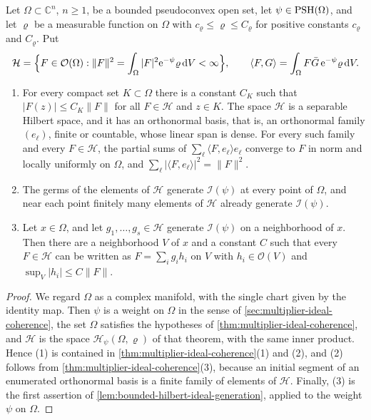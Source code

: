 \begin{lemma}\label{lem:pseudoconvex-weighted-bergman-space}
Let $\Omega\subset\mathbb C^n$, $n\geq1$, be a bounded pseudoconvex open set, let $\psi\in\mathrm{PSH}(\Omega)$, and let $\varrho$ be a measurable function on $\Omega$ with $c_\varrho\leq\varrho\leq C_\varrho$ for positive constants $c_\varrho$ and $C_\varrho$. Put
\[
 \mathcal H=\Bigl\{F\in\mathcal O(\Omega):\|F\|^2=\int_\Omega|F|^2\mathrm e^{-\psi}\varrho\,\mathrm dV<\infty\Bigr\},\qquad\langle F,G\rangle=\int_\Omega F\bar G\,\mathrm e^{-\psi}\varrho\,\mathrm dV.
\]
\begin{enumerate}
\item For every compact set $K\subset\Omega$ there is a constant $C_K$ such that $|F(z)|\leq C_K\|F\|$ for all $F\in\mathcal H$ and $z\in K$. The space $\mathcal H$ is a separable Hilbert space, and it has an orthonormal basis, that is, an orthonormal family $(e_\ell)$, finite or countable, whose linear span is dense. For every such family and every $F\in\mathcal H$, the partial sums of $\sum_\ell\langle F,e_\ell\rangle e_\ell$ converge to $F$ in norm and locally uniformly on $\Omega$, and $\sum_\ell|\langle F,e_\ell\rangle|^2=\|F\|^2$.
\item The germs of the elements of $\mathcal H$ generate $\mathcal I(\psi)$ at every point of $\Omega$, and near each point finitely many elements of $\mathcal H$ already generate $\mathcal I(\psi)$.
\item Let $x\in\Omega$, and let $g_1,\ldots,g_s\in\mathcal H$ generate $\mathcal I(\psi)$ on a neighborhood of $x$. Then there are a neighborhood $V$ of $x$ and a constant $C$ such that every $F\in\mathcal H$ can be written as $F=\sum_ig_ih_i$ on $V$ with $h_i\in\mathcal O(V)$ and $\sup_V|h_i|\leq C\|F\|$.
\end{enumerate}
\end{lemma}
\begin{proof}
We regard $\Omega$ as a complex manifold, with the single chart given by the identity map. Then $\psi$ is a weight on $\Omega$ in the sense of \cref{sec:multiplier-ideal-coherence}, the set $\Omega$ satisfies the hypotheses of \cref{thm:multiplier-ideal-coherence}, and $\mathcal H$ is the space $\mathcal H_\psi(\Omega,\varrho)$ of that theorem, with the same inner product. Hence (1) is contained in \cref{thm:multiplier-ideal-coherence}(1) and (2), and (2) follows from \cref{thm:multiplier-ideal-coherence}(3), because an initial segment of an enumerated orthonormal basis is a finite family of elements of $\mathcal H$. Finally, (3) is the first assertion of \cref{lem:bounded-hilbert-ideal-generation}, applied to the weight $\psi$ on $\Omega$.
\end{proof}

